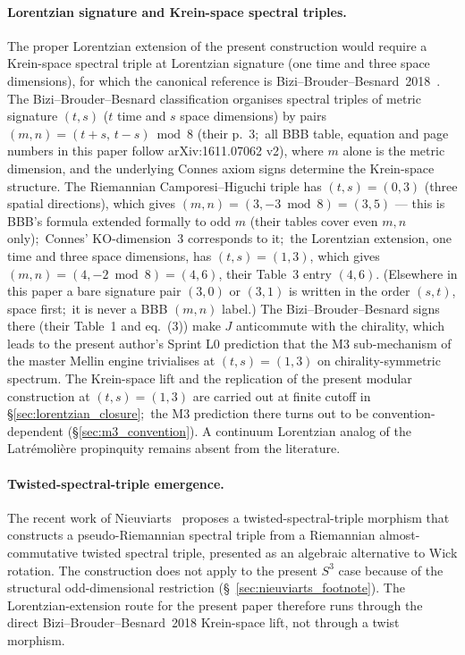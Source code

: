 \documentclass[11pt,a4paper]{article}
\theoremstyle{plain}
\theoremstyle{definition}
\newcommand{\sthree}{S^{3}}
\begin{document}
\paragraph{Lorentzian signature and Krein-space spectral triples.}
The proper Lorentzian extension of the present construction would
require a Krein-space spectral triple at Lorentzian signature (one time
and three space dimensions), for which
the canonical reference is
Bizi--Brouder--Besnard~2018~\cite{bizi_brouder_besnard2018}. The
Bizi--Brouder--Besnard classification organises spectral triples of
metric signature $(t, s)$ ($t$ time and $s$ space dimensions) by pairs
$(m, n) = (t + s,\, t - s) \bmod 8$ (their p.~3;\ all BBB table,
equation and page numbers in this paper follow arXiv:1611.07062 v2),
where $m$ alone is the metric dimension, and the underlying Connes axiom
signs determine the Krein-space structure.
The Riemannian Camporesi--Higuchi triple has $(t, s) = (0, 3)$ (three
spatial directions), which gives $(m, n) = (3, -3 \bmod 8) = (3, 5)$
--- this is BBB's formula extended formally to odd $m$ (their tables
cover even $m, n$ only);\ Connes' KO-dimension~3
corresponds to it;\ the
Lorentzian extension, one time and three space dimensions, has
$(t, s) = (1, 3)$, which gives $(m, n) = (4, -2 \bmod 8) = (4, 6)$, their
Table~3 entry $(4, 6)$.  (Elsewhere in this paper a bare signature pair
$(3, 0)$ or $(3, 1)$ is written in the order $(s, t)$, space first;\ it is
never a BBB $(m, n)$ label.) The Bizi--Brouder--Besnard signs there (their
Table~1 and eq.~(3)) make $J$ anticommute with the chirality, which leads to the
present author's Sprint L0 prediction that the M3 sub-mechanism of
the master Mellin engine trivialises at $(t, s) = (1, 3)$ on chirality-symmetric
spectrum.
The Krein-space lift and the replication of the present modular
construction at $(t, s) = (1, 3)$ are carried out at finite cutoff in
\S\ref{sec:lorentzian_closure};\ the M3 prediction there turns out to be
convention-dependent (\S\ref{sec:m3_convention}).  A continuum
Lorentzian analog of the Latr\'emoli\`ere propinquity remains absent from
the literature.

\paragraph{Twisted-spectral-triple emergence.}
The recent work of
Nieuviarts~\cite{nieuviarts2025a, nieuviarts2024, nieuviarts2025b_proceedings}
proposes a twisted-spectral-triple morphism that constructs a
pseudo-Riemannian spectral triple from a Riemannian almost-commutative
twisted spectral triple, presented as an algebraic alternative to
Wick rotation. The construction does not apply to the present
$\sthree$ case because of the structural odd-dimensional restriction
(\S~\ref{sec:nieuviarts_footnote}). The Lorentzian-extension route for
the present paper therefore runs through the direct
Bizi--Brouder--Besnard~2018 Krein-space lift, not through a twist
morphism.
\end{document}
